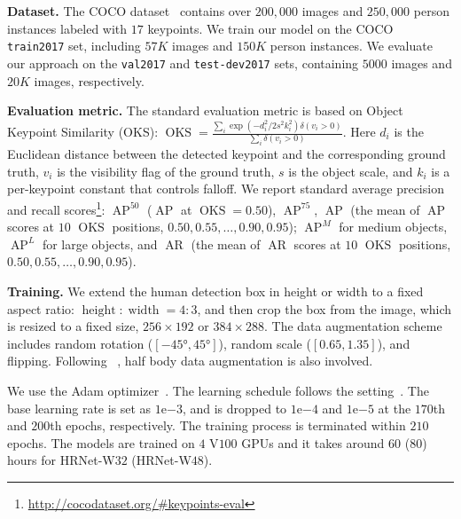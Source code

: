 \documentclass[10pt,journal,compsoc]{IEEEtran}
\begin{document}
\vspace{.1cm}
\noindent\textbf{Dataset.}
The COCO dataset~\cite{LinMBHPRDZ14} contains over 
$200,000$ images and $250,000$ person instances labeled with $17$ keypoints. 
We train our model on the COCO \texttt{train2017} set, 
including $57K$ images 
and $150K$ person instances. 
We evaluate our approach on the \texttt{val2017} and \texttt{test-dev2017} sets, 
containing $5000$ images and $20K$ images, respectively.

\vspace{.1cm}
\noindent\textbf{Evaluation metric.}
The standard evaluation metric
is
based on Object Keypoint Similarity (OKS):
$\operatorname{OKS} = \frac{\sum_{i}\exp(-d_i^2/2s^2k_i^2)\delta(v_i > 0)}{\sum_i \delta(v_i > 0)}.$
Here $d_i$ is the Euclidean distance between 
the detected keypoint and the corresponding ground truth,
$v_i$ is the visibility flag of the ground truth,
$s$ is the object scale, and 
$k_i$ is a per-keypoint constant that controls falloff.
We report standard average precision and recall scores\footnote{\url{http://cocodataset.org/\#keypoints-eval}}:
$\operatorname{AP}^{50}$ ($\operatorname{AP}$ at $\operatorname{OKS} = 0.50$),
$\operatorname{AP}^{75}$,
$\operatorname{AP}$ 
(the mean of $\operatorname{AP}$ scores at $10$ 
$\operatorname{OKS}$
positions,
$0.50, 0.55, \dots,0.90, 0.95$);
$\operatorname{AP}^M$  for medium objects,
$\operatorname{AP}^L$  for large objects,
and $\operatorname{AR}$ (the mean of $\operatorname{AR}$ scores at $10$ $\operatorname{OKS}$
positions,
$0.50, 0.55, \dots,0.90, 0.95$).

\vspace{.1cm}
\noindent\textbf{Training.}
We extend the human detection box in height or width 
to a fixed aspect ratio:
$\operatorname{height}: \operatorname{width} = 4 : 3$,
and then crop the box from the image,
which is resized to a fixed size, $256 \times 192$ or $384 \times 288$.
The data augmentation scheme includes
random rotation ($[\ang{-45}, \ang{45}] $),
random scale ($[0.65, 1.35]$), and flipping. 
Following ~\cite{wang2018mscoco}, half body data augmentation is also involved.

We use the Adam optimizer~\cite{KingmaB14}.
The learning schedule
follows the setting~\cite{XiaoWW18}.
The base learning rate is set as $1\mathrm{e}{-3}$,
and is dropped to $1\mathrm{e}{-4}$ and $1\mathrm{e}{-5}$ 
at the $170$th and $200$th epochs, respectively.
The training process is terminated within $210$ epochs.
{The models
are trained on
$4$ V$100$ GPUs
and it takes around $60$ ($80$) hours for HRNet-W$32$
(HRNet-W$48$).}
\end{document}
